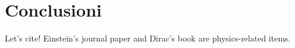 \documentclass[12pt,a4paper,twoside]{report}
\begin{document}
	
	
	
	
	
	
	
	


	
	
	
	
			
	
	\chapter*{Conclusioni}
		Let's cite! Einstein's journal paper \cite{einstein} and Dirac's book \cite{dirac} are physics-related items.
	\newpage	
	\printbibliography[
		heading=bibintoc,
		title={Bibliografia}
		]
		 	
\end{document}
